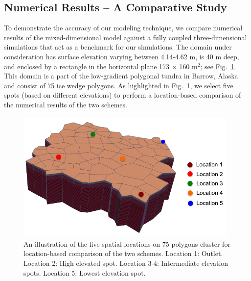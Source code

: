 \documentclass[review]{elsarticle}
\begin{document}
\subsection {Numerical Results -- A Comparative Study} 
To demonstrate the accuracy of our modeling technique, we compare numerical results of the mixed-dimensional model against a fully coupled three-dimensional simulations that act as a benchmark for our simulations. The domain under consideration has surface elevation varying between 4.14-4.62 m, is 40 m deep, and enclosed by a rectangle in the horizontal plane 173 $\times$ 160 m$^2$; see Fig.~\ref{surf-location}. This domain is a part of the low-gradient polygonal tundra in Barrow, Alaska and consist of 75 ice wedge polygons. As highlighted in Fig.~\ref{surf-location}, we select five spots (based on different elevations) to perform a location-based comparison of the numerical results of the two schemes. 
\begin{figure}[!htpb]
\centering
\includegraphics[height = 6.5cm, width=11cm]{figures/lobster75-3d.png}
\caption{An illustration of the five spatial locations on 75 polygons cluster for location-based comparison of the two schemes. Location 1: Outlet. Location 2: High elevated spot. Location 3-4: Intermediate elevation spots. Location 5: Lowest elevation spot.}
\label{surf-location}
\end{figure}
\end{document}
